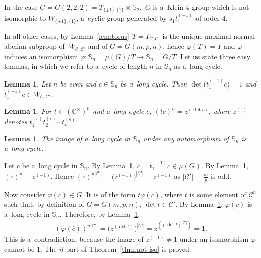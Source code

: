 \documentclass[pdftex]{sigma}
\newcommand{\g}[1]{t_{#1}^{(-1)}}
\newtheorem{Lemma}[Theorem]{Lemma}
\begin{document}
In the case $G=G(2,2,2)=T_{\{\pm1\},\{1\}}\times \mathbb S_2$,~$G$ is a~Klein $4$-group which is not isomorphic to
$W_{\{\pm1\},\{1\}}$, a~cyclic group generated by $s_1\g 1$ of order $4$.

In all other cases, by Lemma~\ref{lem:torus} $T=T_{{\mathcal C},{\mathcal C}'}$ is the unique maximal normal abelian
subgroup of~$W_{{\mathcal C},{\mathcal C}'}$ and of $G=G(m,p,n)$, hence $\varphi(T)=T$ and $\varphi$ induces an
isomorphism $\overline\varphi\colon \mathbb S_n=\mu(G)/T \to \mathbb S_n=G/T$.
Let us state three easy lemmas, in which we refer to a~cycle of length $n$ in $\mathbb S_n$ as a~long cycle.

\begin{Lemma}
\label{lem:1}
Let $n$ be even and $c\in \mathbb S_n$ be a~long cycle.
Then $\det\big(\g 1 c\big)=1$ and $t_1^{(-1)} c\in W_{{\mathcal C},{\mathcal C}'}$.
\end{Lemma}

\begin{Lemma}
\label{lem:2}
For $t\in (\mathbb C^\times)^n$ and a~long cycle $c$, $(tc)^n=z^{(\det t)}$, where $z^{(\epsilon)}$ denotes
$t_1^{(\epsilon)}t_2^{(\epsilon)}\cdots t_n^{(\epsilon)}$.
\end{Lemma}

\begin{Lemma}\label{lem:3}
The image of a~long cycle in $\mathbb S_n$ under any automorphism of $\mathbb S_n$ is a~long cycle.
\end{Lemma}

Let $c$ be a~long cycle in $\mathbb S_n$.
By Lemma~\ref{lem:1}, $\overline c=t_1^{(-1)}c\in\mu(G)$.
By Lemma~\ref{lem:2}, $(\overline{c})^n=z^{(-1)}$.
Hence $(\overline{c})^{n|{\mathcal C}'|}=\big(z^{(-1)}\big)^{|{\mathcal C}'|}= z^{(-1)}$ as $|{\mathcal C}'|=\frac mp$ is odd.

Now consider $\varphi(\overline c)\in G$.
It is of the form $t\overline{\varphi}(c)$, where $t$ is some element of ${\mathcal C}^n$ such that, by def\/inition of
$G=G(m,p,n)$, $\det t\in {\mathcal C}'$.
By Lemma~\ref{lem:3}, $\overline{\varphi}(c)$ is a~long cycle in $\mathbb S_n$.
Therefore, by Lemma~\ref{lem:2},
\begin{gather*}
(\varphi(\overline c))^{n|{\mathcal C}'|} = \big(z^{(\det t)}\big)^{|{\mathcal C}'|} = z^{((\det t)^{|{\mathcal C}'|})} =1.
\end{gather*}
This is a~contradiction, because the image of $z^{(-1)}\ne 1$ under an isomorphism $\varphi$ cannot be $1$.
The \textit{if} part of Theorem~\ref{thm:not iso} is proved.
\end{document}

